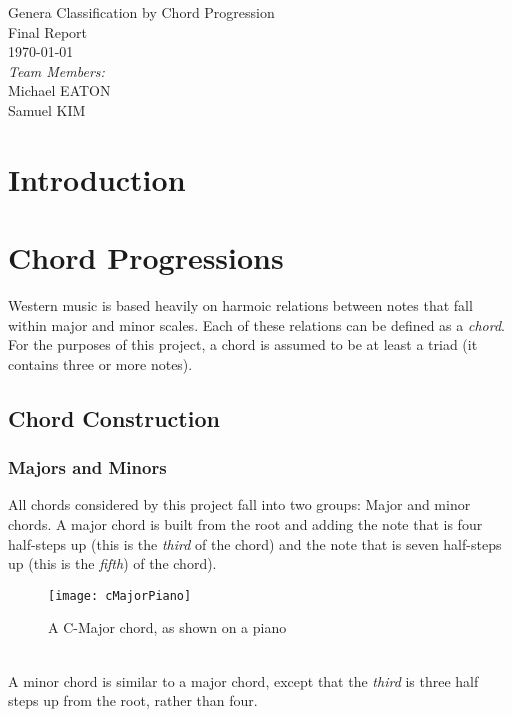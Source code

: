 \documentclass{article}
\begin{document}
\fancyhf{}
\rhead{\today}

\begin{titlepage}
\begin{center}
{\huge Genera Classification by Chord Progression}\\[2cm]
{\Large Final Report}\\[2cm]
{\large \today}\\[2cm]
\emph{Team Members:}\\
Michael \uppercase{Eaton}\\
Samuel \uppercase{Kim}\\
\end{center}
\end{titlepage}

\tableofcontents
\newpage

\section{Introduction}

\newpage

\section{Chord Progressions}
Western music is based heavily on harmoic relations between notes that fall within major and minor scales. Each of these relations can be defined as a \emph{chord}.  For the purposes of this project, a chord is assumed to be at least a triad (it contains three or more notes).
\subsection{Chord Construction}
\subsubsection{Majors and Minors}
All chords considered by this project fall into two groups:  Major and minor chords.  A major chord is built from the root and adding the note that is four half-steps up (this is the \emph{third} of the chord) and the note that is seven half-steps up (this is the \emph{fifth}) of the chord).\\
\begin{figure}[htb]
\texttt{[image: cMajorPiano]}
\caption{A  C-Major chord, as shown on a piano}
\end{figure} \\
A minor chord is similar to a major chord, except that the \emph{third} is three half steps up from the root, rather than four.
\end{document}
